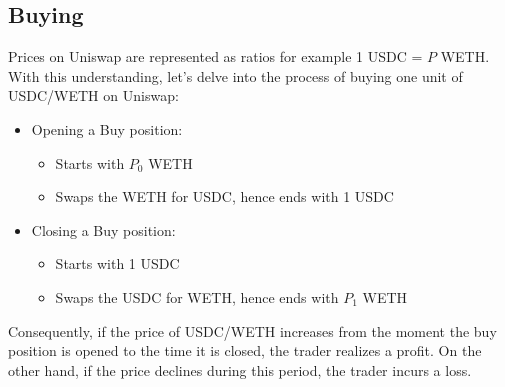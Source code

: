 \subsection{Buying}
Prices on Uniswap are represented as ratios for example 1 USDC = $P$ WETH. With this understanding, let's delve into the process of buying one unit of USDC/WETH on Uniswap:
\begin{itemize}
    \item Opening a Buy position:\begin{itemize}
        \item Starts with $P_{0}$ WETH
        \item Swaps the WETH for USDC, hence ends with 1 USDC
    \end{itemize}
    \item Closing a Buy position:\begin{itemize}
        \item Starts with 1 USDC
        \item Swaps the USDC for WETH, hence ends with $P_1$ WETH
    \end{itemize}
\end{itemize}
\noindent Consequently, if the price of USDC/WETH increases from the moment the buy position is opened to the time it is closed, the trader realizes a profit. On the other hand, if the price declines during this period, the trader incurs a loss.

